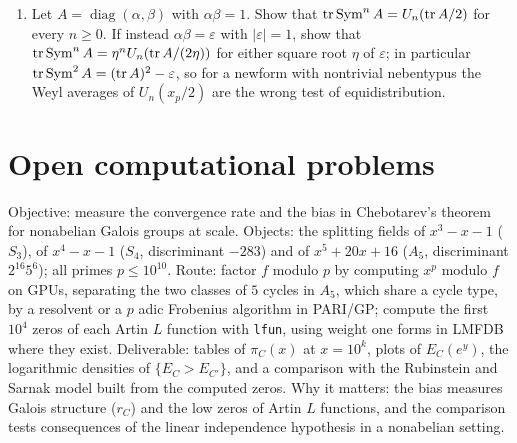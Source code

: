 \begin{enumerate}
\item\label{ex:ch3neben} Let $A=\operatorname{diag}(\alpha,\beta)$ with $\alpha\beta=1$. Show that $\operatorname{tr}\operatorname{Sym}^nA=U_n(\operatorname{tr} A/2)$ for every $n\ge0$. If instead $\alpha\beta=\varepsilon$ with $|\varepsilon|=1$, show that $\operatorname{tr}\operatorname{Sym}^nA=\eta^nU_n(\operatorname{tr} A/(2\eta))$ for either square root $\eta$ of $\varepsilon$; in particular $\operatorname{tr}\operatorname{Sym}^2A=(\operatorname{tr} A)^2-\varepsilon$, so for a newform with nontrivial nebentypus the Weyl averages of $U_n(x_p/2)$ are the wrong test of equidistribution.
\end{enumerate}

\section{Open computational problems}

\begin{compproblem}
Objective: measure the convergence rate and the bias in Chebotarev's theorem for nonabelian Galois groups at scale. Objects: the splitting fields of $x^3-x-1$ ($S_3$), of $x^4-x-1$ ($S_4$, discriminant $-283$) and of $x^5+20x+16$ ($A_5$, discriminant $2^{16}5^6$); all primes $p\le10^{10}$. Route: factor $f$ modulo $p$ by computing $x^p$ modulo $f$ on GPUs, separating the two classes of $5$ cycles in $A_5$, which share a cycle type, by a resolvent or a $p$ adic Frobenius algorithm in PARI/GP; compute the first $10^4$ zeros of each Artin $L$ function with \texttt{lfun}, using weight one forms in LMFDB where they exist. Deliverable: tables of $\pi_C(x)$ at $x=10^k$, plots of $E_C(e^y)$, the logarithmic densities of $\{E_C>E_{C'}\}$, and a comparison with the Rubinstein and Sarnak model built from the computed zeros. Why it matters: the bias measures Galois structure ($r_C$) and the low zeros of Artin $L$ functions, and the comparison tests consequences of the linear independence hypothesis in a nonabelian setting.
\end{compproblem}

